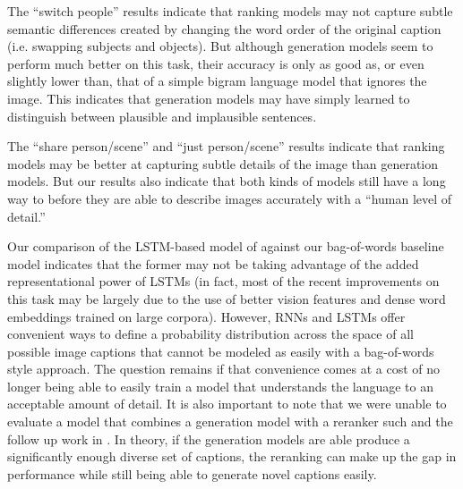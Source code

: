 \documentclass[11pt]{article}
\begin{document}
The ``switch people''  results indicate that ranking models may not capture subtle semantic differences created by changing the word order of the original caption (i.e. swapping subjects and objects). But although generation models seem to perform much better on this task, their accuracy is only as good as, or even slightly lower than, that of a simple bigram language model that ignores the image. This indicates that generation models may have simply learned to distinguish between plausible and implausible sentences. 

The ``share person/scene'' and ``just person/scene''  results indicate that ranking models may be better at capturing subtle details of the image than generation models. But our results also indicate that both kinds of models still have a long way to before they are able to describe images accurately with a ``human level of detail.'' 

Our comparison of the LSTM-based model of  against our bag-of-words baseline model indicates that the former may not be taking advantage of the added representational power of LSTMs (in fact, most of the recent improvements on this task may be largely due to the use of better vision features  and dense word embeddings trained on large corpora). However, RNNs \cite{Elman90findingstructure} and LSTMs offer convenient ways to define a probability distribution across the space of all possible image captions that cannot be modeled as easily with a bag-of-words style approach. The question remains if that convenience comes at a cost of no longer being able to easily train a model that understands the language to an acceptable amount of detail. It is also important to note that we were unable to evaluate a model that combines a generation model with a reranker such  and the follow up work in . In theory, if the generation models are able produce a significantly enough diverse set of captions, the reranking can make up the gap in performance while still being able to generate novel captions easily.
\end{document}
